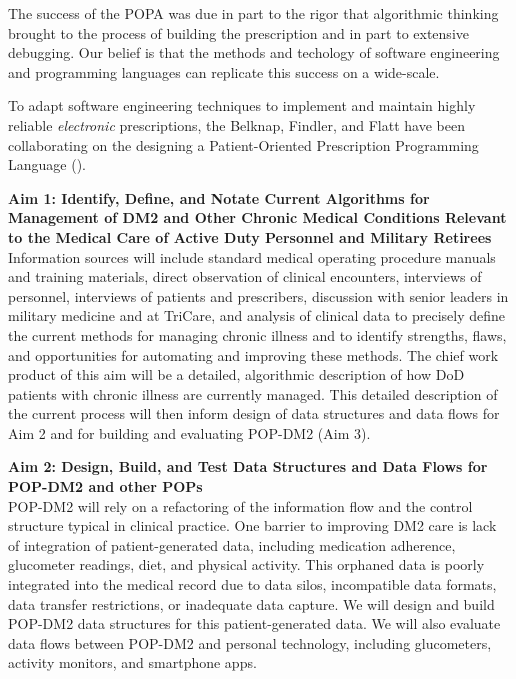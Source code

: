 \documentclass[11pt]{article}
\begin{document}
The success of the POPA was due in part to the rigor that algorithmic
thinking brought to the process of building the prescription and in
part to extensive debugging. Our belief is that the methods and
techology of software engineering and programming languages can
replicate this success on a wide-scale.

To adapt software engineering techniques to implement and maintain
highly reliable \emph{electronic} prescriptions, the Belknap, Findler,
and Flatt have been collaborating on the designing a Patient-Oriented
Prescription Programming Language (\poppl{}). 

\newcommand{\aim}[1]{\vspace{.1in}\noindent\textbf{Aim #1}\\}

\aim{1: Identify, Define, and Notate Current Algorithms for Management of DM2 and Other Chronic Medical Conditions Relevant to the Medical Care of Active Duty Personnel and Military Retirees}
 Information sources will include standard medical operating procedure
 manuals and training materials, direct observation of clinical
 encounters, interviews of personnel, interviews of patients and
 prescribers, discussion with senior leaders in military medicine and
 at TriCare, and analysis of clinical data to precisely define the
 current methods for managing chronic illness and to identify
 strengths, flaws, and opportunities for automating and improving
 these methods. The chief work product of this aim will be a detailed,
 algorithmic description of how DoD patients with chronic illness are
 currently managed. This detailed description of the current process
 will then inform design of data structures and data flows for 
 Aim 2 and for building and evaluating POP-DM2 (Aim 3).

\aim{2: Design, Build, and Test Data Structures and Data Flows for POP-DM2 and other POPs}
 POP-DM2 will rely on a refactoring of the information flow and the
 control structure typical in clinical practice. One barrier to
 improving DM2 care is lack of integration of patient-generated data,
 including medication adherence, glucometer readings, diet, and
 physical activity. This orphaned data is poorly integrated into the
 medical record due to data silos, incompatible data formats, data
 transfer restrictions, or inadequate data capture. We will design and
 build POP-DM2 data structures for this patient-generated data. We
 will also evaluate data flows between POP-DM2 and personal
 technology, including glucometers, activity monitors, and smartphone
 apps.
\end{document}
